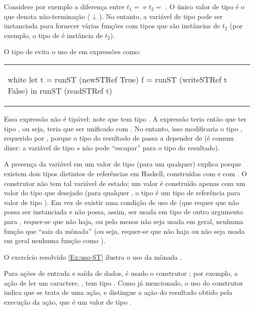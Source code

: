 Considere por exemplo a diferença entre 
  $t_1 = $  e 
  $t_2 = $ . 
O único valor de tipo  é o que denota não-terminação
($\perp$). No entanto, a variável de tipo  pode ser instanciada
para fornecer várias funções com tipos que são instâncias de $t_2$
(por exemplo, o tipo de  é instância de $t_2$).

O tipo de  evita o uso de  em expressões como: 

\begin{center}
\begin{tabular}{l}
\begin{alg}{.5\textwidth}{white}
let t = runST (newSTRef True)
    f = runST (writeSTRef t False)
in runST (readSTRef t)
\end{alg}
\end{tabular}
\end{center}

Essa expressão não é tipável: note que  tem tipo
. A expressão 
teria então que ter tipo , ou seja,  teria
que ser unificado com . No entanto, isso modificaria
o tipo , requerido por , porque o tipo do
resultado de  passa a depender de  (é
comum dizer: a variável de tipo $s$ não pode ``escapar'' para o tipo
do resultado).

A presença da variável  em um valor de tipo 
(para um  qualquer) explica porque existem dois tipos distintos
de referências em Haskell, construídas com  e com
. O construtor  não tem tal variável de estado;
um valor é construído apenas com um valor do tipo que desejado (para
qualquer , o tipo  é um tipo de referência para
valor de tipo ). Em vez de existir uma condição de uso de
 (que requer que  não possa ser instanciada e não possa,
assim, ser usada em tipo de outro argumento para ,
requer-se que não haja, ou pelo menos não seja usada em geral, nenhuma
função que ``saia da mônada''  (ou seja, requer-se que não
haja ou não seja usada em geral nenhuma função como
).

O exercício resolvido \ref{Ex:uso-ST} ilustra o uso da mônada
.

Para ações de entrada e saída de dados, é usado o construtor ;
por exemplo, a ação de ler um caractere, , tem tipo
. Como já mencionado, o uso do construtor  indica
que se trata de uma ação, e distingue a ação do resultado obtido pela
execução da ação, que é um valor de tipo .

